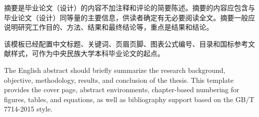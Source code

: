 \begin{cnabstract}
摘要是毕业论文（设计）的内容不加注释和评论的简要陈述。摘要的内容应包含与毕业论文（设计）同等量的主要信息，供读者确定有无必要阅读全文。摘要一般应说明研究工作目的、方法、结果和最终结论等，重点是结果和结论。

该模板已经配置中文标题、关键词、页眉页脚、图表公式编号、目录和国标参考文献样式，可作为中央民族大学本科毕业论文的起点。


\end{cnabstract}

\begin{enabstract}

  The English abstract should briefly summarize the research background, objective,
  methodology, results, and conclusion of the thesis. This template provides the
  cover page, abstract environments, chapter-based numbering for figures, tables,
  and equations, as well as bibliography support based on the GB/T 7714-2015 style.
\end{enabstract}
